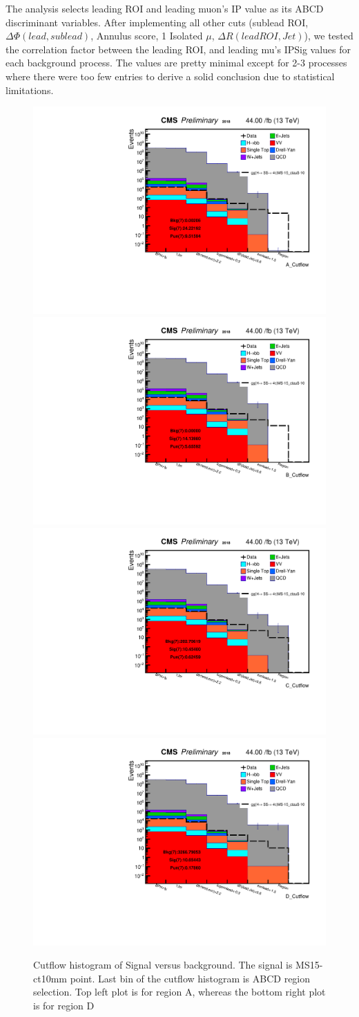 The analysis selects leading ROI and leading muon's IP value as its ABCD discriminant variables.
After implementing all other cuts (sublead ROI, $\Delta\Phi(lead,sublead)$, Annulus score, 1 Isolated $\mu$, $\Delta R(lead ROI, Jet)$), we tested the correlation factor between the leading ROI, and leading mu's IPSig values for each background process.
The values are pretty minimal except for 2-3 processes where there were too few entries to derive a solid conclusion due to statistical limitations.
 \begin{figure}[h!]
   \caption{Cutflow histogram of Signal versus background. The signal is MS15\GeV-ct10mm point. Last bin of the cutflow histogram is ABCD region selection. Top left plot is for region A, whereas the bottom right plot is for region D}
   \label{fig:ABmethod}
   \centering
   \includegraphics[width=0.47\linewidth]{figs/log_Oct6CutflAnalysisNote_MS-15_ctauS-10_A_Cutflow.pdf}
   \includegraphics[width=0.47\linewidth]{figs/log_Oct6CutflAnalysisNote_MS-15_ctauS-10_B_Cutflow.pdf}
   \includegraphics[width=0.47\linewidth]{figs/log_Oct6CutflAnalysisNote_MS-15_ctauS-10_C_Cutflow.pdf}
   \includegraphics[width=0.47\linewidth]{figs/log_Oct6CutflAnalysisNote_MS-15_ctauS-10_D_Cutflow.pdf}
 \end{figure}

